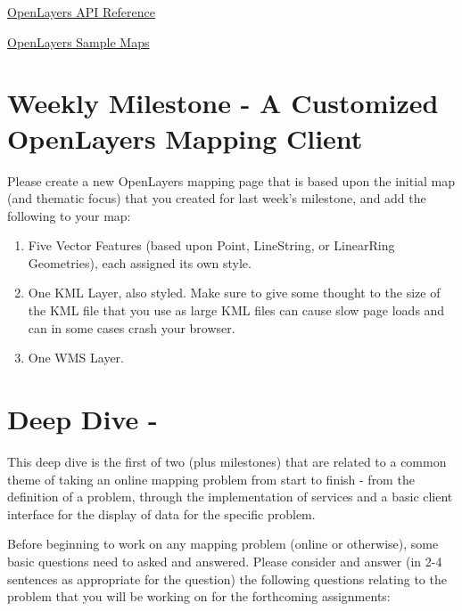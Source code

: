 \documentclass[]{book}
\begin{document}
\href{http://openlayers.org/en/v3.14.2/apidoc/}{OpenLayers API
Reference}

\href{http://openlayers.org/en/v3.2.1/examples/}{OpenLayers Sample Maps}

\section{Weekly Milestone - A Customized OpenLayers Mapping
Client}\label{week11-milestone}

Please create a new OpenLayers mapping page that is based upon the
initial map (and thematic focus) that you created for last week's
milestone, and add the following to your map:

\begin{enumerate}
\def\labelenumi{\arabic{enumi}.}
\item
  Five Vector Features (based upon Point, LineString, or LinearRing
  Geometries), each assigned its own style.
\item
  One KML Layer, also styled. Make sure to give some thought to the size
  of the KML file that you use as large KML files can cause slow page
  loads and can in some cases crash your browser.
\item
  One WMS Layer.
\end{enumerate}

\section{Deep Dive -}\label{week11-deepDive}

This deep dive is the first of two (plus milestones) that are related to
a common theme of taking an online mapping problem from start to finish
- from the definition of a problem, through the implementation of
services and a basic client interface for the display of data for the
specific problem.

Before beginning to work on any mapping problem (online or otherwise),
some basic questions need to asked and answered. Please consider and
answer (in 2-4 sentences as appropriate for the question) the following
questions relating to the problem that you will be working on for the
forthcoming assignments:
\end{document}

